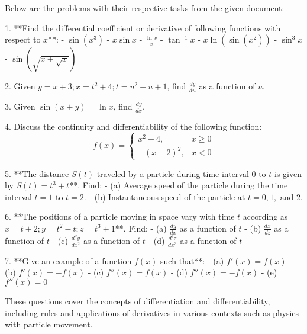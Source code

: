 Below are the problems with their respective tasks from the given document:

1. **Find the differential coefficient or derivative of following functions with respect to \(x\)**:
   - \( \sin(x^3) \)
   - \( x \sin x \)
   - \( \frac{\ln x}{x} \)
   - \( \tan^{-1} x \)
   - \( x \ln(\sin(x^2)) \)
   - \( \sin^3 x \)
   - \( \sin \left( \sqrt{x + \sqrt{x}} \right) \)

2. Given \( y = x + 3; x = t^2 + 4; t = u^2 - u + 1 \), find \(\frac{dy}{du}\) as a function of \(u\).

3. Given \(\sin(x + y) = \ln x\), find \(\frac{dy}{dx}\).

4. Discuss the continuity and differentiability of the following function:
   \[ 
   f(x) = 
   \begin{cases} 
   x^2 - 4, & x \geq 0 \\
   -(x - 2)^2, & x < 0 
   \end{cases}
   \]

5. **The distance \( S(t) \) traveled by a particle during time interval \(0\) to \(t\) is given by \( S(t) = t^3 + t \)**. Find:
   - (a) Average speed of the particle during the time interval \( t = 1 \) to \( t = 2 \).
   - (b) Instantaneous speed of the particle at \( t = 0, 1, \text{ and } 2 \).

6. **The positions of a particle moving in space vary with time \( t \) according as \( x = t + 2; y = t^2 - t; z = t^3 + 1 \)**. Find:
   - (a) \( \frac{dy}{dx} \) as a function of \( t \)
   - (b) \( \frac{dx}{dz} \) as a function of \( t \)
   - (c) \( \frac{d^2y}{dx^2} \) as a function of \( t \)
   - (d) \( \frac{d^3z}{dx^3} \) as a function of \( t \)

7. **Give an example of a function \( f(x) \) such that**:
   - (a) \( f'(x) = f(x) \)
   - (b) \( f'(x) = -f(x) \)
   - (c) \( f''(x) = f(x) \)
   - (d) \( f''(x) = -f(x) \)
   - (e) \( f''(x) = 0 \)

These questions cover the concepts of differentiation and differentiability, including rules and applications of derivatives in various contexts such as physics with particle movement.